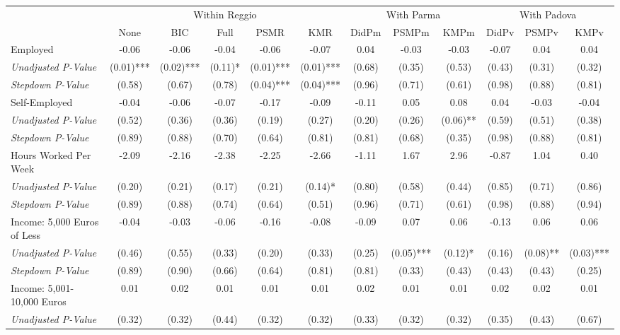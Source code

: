 \begin{tabular}{l c c c c c c c c c c c}
\toprule
& \multicolumn{5}{c}{Within Reggio} & \multicolumn{3}{c}{With Parma} & \multicolumn{3}{c}{With Padova} \\\cmidrule(lr){2-6} \cmidrule(lr){7-9} \cmidrule(lr){10-12}
 & None & BIC & Full & PSMR & KMR & DidPm & PSMPm & KMPm & DidPv & PSMPv & KMPv \\
\midrule
Employed & -0.06 & -0.06 & -0.04 & -0.06 & -0.07 & 0.04 & -0.03 & -0.03 & -0.07 & 0.04 & 0.04 \\
\quad \textit{Unadjusted P-Value} & (0.01)*** & (0.02)*** & (0.11)* & (0.01)*** & (0.01)*** & (0.68) & (0.35) & (0.53) & (0.43) & (0.31) & (0.32) \\
\quad \textit{Stepdown P-Value} & (0.58) & (0.67) & (0.78) & (0.04)*** & (0.04)*** & (0.96) & (0.71) & (0.61) & (0.98) & (0.88) & (0.81) \\
Self-Employed & -0.04 & -0.06 & -0.07 & -0.17 & -0.09 & -0.11 & 0.05 & 0.08 & 0.04 & -0.03 & -0.04 \\
\quad \textit{Unadjusted P-Value} & (0.52) & (0.36) & (0.36) & (0.19) & (0.27) & (0.20) & (0.26) & (0.06)** & (0.59) & (0.51) & (0.38) \\
\quad \textit{Stepdown P-Value} & (0.89) & (0.88) & (0.70) & (0.64) & (0.81) & (0.81) & (0.68) & (0.35) & (0.98) & (0.88) & (0.81) \\
Hours Worked Per Week & -2.09 & -2.16 & -2.38 & -2.25 & -2.66 & -1.11 & 1.67 & 2.96 & -0.87 & 1.04 & 0.40 \\
\quad \textit{Unadjusted P-Value} & (0.20) & (0.21) & (0.17) & (0.21) & (0.14)* & (0.80) & (0.58) & (0.44) & (0.85) & (0.71) & (0.86) \\
\quad \textit{Stepdown P-Value} & (0.89) & (0.88) & (0.74) & (0.64) & (0.51) & (0.96) & (0.71) & (0.61) & (0.98) & (0.88) & (0.94) \\
Income: 5,000 Euros of Less & -0.04 & -0.03 & -0.06 & -0.16 & -0.08 & -0.09 & 0.07 & 0.06 & -0.13 & 0.06 & 0.06 \\
\quad \textit{Unadjusted P-Value} & (0.46) & (0.55) & (0.33) & (0.20) & (0.33) & (0.25) & (0.05)*** & (0.12)* & (0.16) & (0.08)** & (0.03)*** \\
\quad \textit{Stepdown P-Value} & (0.89) & (0.90) & (0.66) & (0.64) & (0.81) & (0.81) & (0.33) & (0.43) & (0.43) & (0.43) & (0.25) \\
Income: 5,001-10,000 Euros & 0.01 & 0.02 & 0.01 & 0.01 & 0.01 & 0.02 & 0.01 & 0.01 & 0.02 & 0.02 & 0.01 \\
\quad \textit{Unadjusted P-Value} & (0.32) & (0.32) & (0.44) & (0.32) & (0.32) & (0.33) & (0.32) & (0.32) & (0.35) & (0.43) & (0.67) \\

\end{tabular}
